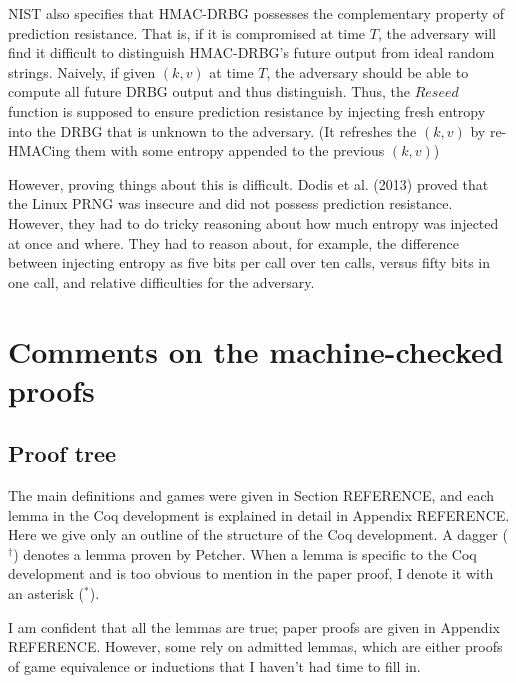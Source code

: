 \documentclass[12pt,lot, lof]{puthesis}
\begin{document}
{%
NIST also specifies that HMAC-DRBG possesses the complementary property of prediction resistance. That is, if it is compromised at time $T$, the adversary will find it difficult to distinguish HMAC-DRBG's future output from ideal random strings. Naively, if given $(k, v)$ at time $T$, the adversary should be able to compute all future DRBG output and thus distinguish. Thus, the $Reseed$ function is supposed to ensure prediction resistance by injecting fresh entropy into the DRBG that is unknown to the adversary. (It refreshes the $(k,v)$ by re-HMACing them with some entropy appended to the previous $(k,v)$)

However, proving things about this is difficult. Dodis et al. (2013) proved that the Linux PRNG was insecure and did not possess prediction resistance. However, they had to do tricky reasoning about how much entropy was injected at once and where. They had to reason about, for example, the difference between injecting entropy as five bits per call over ten calls, versus fifty bits in one call, and relative difficulties for the adversary. 



\chapter{Comments on the machine-checked proofs}

\section{Proof tree}

The main definitions and games were given in Section REFERENCE, and each lemma in the Coq development is explained in detail in Appendix REFERENCE. Here we give only an outline of the structure of the Coq development. A dagger ($^\dag$) denotes a lemma proven by Petcher. When a lemma is specific to the Coq development and is too obvious to mention in the paper proof, I denote it with an asterisk ($^*$).

I am confident that all the lemmas are true; paper proofs are given in Appendix REFERENCE. However, some rely on admitted lemmas, which are either proofs of game equivalence or inductions that I haven't had time to fill in. \\

}
\end{document}
